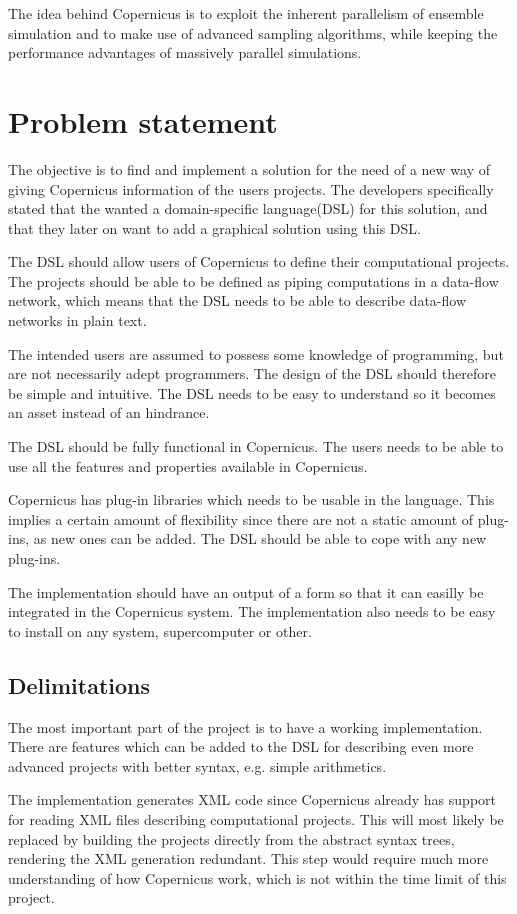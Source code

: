 The idea behind Copernicus is to exploit the inherent parallelism of
ensemble simulation and to make use of advanced sampling algorithms,
while keeping the performance advantages of massively parallel
simulations.

\section{Problem statement}
The objective is to find and implement a solution for the need of a
new way of giving Copernicus information of the users projects. The
developers specifically stated that the wanted a domain-specific
language(DSL) for this solution, and that they later on want to add a
graphical solution using this DSL.

The DSL should allow users of Copernicus to define their computational
projects. The projects should be able to be defined as piping
computations in a data-flow network, which means that the DSL needs to
be able to describe data-flow networks in plain text.

The intended users are assumed to possess some knowledge of
programming, but are not necessarily adept programmers. The design of
the DSL should therefore be simple and intuitive. The DSL needs to be
easy to understand so it becomes an asset instead of an hindrance.

The DSL should be fully functional in Copernicus. The users needs to
be able to use all the features and properties available in
Copernicus.

Copernicus has plug-in libraries which needs to be usable in the
language. This implies a certain amount of flexibility since there are
not a static amount of plug-ins, as new ones can be added. The DSL
should be able to cope with any new plug-ins.

The implementation should have an output of a form so that it can
easilly be integrated in the Copernicus system. The implementation
also needs to be easy to install on any system, supercomputer or
other.

\subsection{Delimitations}
The most important part of the project is to have a working
implementation. There are features which can be added to the DSL for
describing even more advanced projects with better syntax, e.g. simple
arithmetics.

The implementation generates XML code since Copernicus already has
support for reading XML files describing computational projects. This
will most likely be replaced by building the projects directly from
the abstract syntax trees, rendering the XML generation
redundant. This step would require much more understanding of how
Copernicus work, which is not within the time limit of this project.


